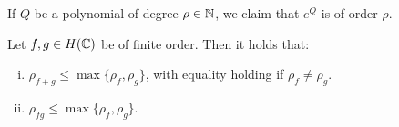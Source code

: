 \begin{remark}\label{rem:order-exponential-polynomial}
    If $Q$ be a polynomial of degree $\rho \in \mathbb{N}$, we claim that $e^Q$ is of order $\rho$.
\end{remark}

\begin{proposition} \label{prop:order-sum-product-estimate}
    Let $f, g \in H(\mathbb{C})$ be of finite order. Then it holds that:
    \begin{enumerate}[i.]
        \item $\rho_{f + g} \leq \max \{ \rho_f, \rho_g \}$, with equality holding if $\rho_f \neq \rho_g$.
        \item $\rho_{fg} \leq \max \{ \rho_f, \rho_g \}$.
    \end{enumerate}
\end{proposition}

